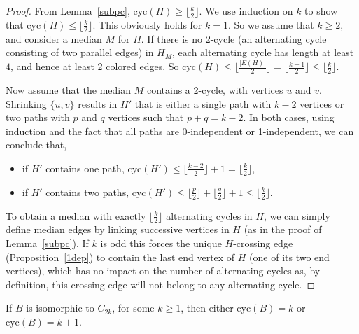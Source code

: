 \documentclass[10pt]{llncs}
\begin{document}
\begin{proof}
  From Lemma~\ref{subpc}, $\text{cyc}(H) \geq \lfloor
  \frac{k}{2}\rfloor$. We use induction on $k$ to show that
  $\text{cyc}(H) \leq \lfloor \frac{k}{2}\rfloor$. This obviously
  holds for $k = 1$. So we assume that $k \geq 2$, and consider a
  median $M$ for $H$. If there is no 2-cycle (an alternating cycle
  consisting of two parallel edges) in $H_M$, each alternating cycle
  has length at least $4$, and hence at least 2 colored edges. So
  $\text{cyc}(H) \leq \lfloor \frac{|E(H)|}{2} \rfloor = \lfloor
  \frac{k-1}{2} \rfloor \leq \lfloor \frac{k}{2}\rfloor$.

  Now assume that the median $M$ contains a 2-cycle, with vertices $u$
  and $v$. Shrinking $\{u, v\}$ results in $H'$ that is either a
  single path with $k-2$ vertices or two paths with $p$ and $q$
  vertices such that $p+q = k-2$.  In both cases, using induction and
  the fact that all paths are 0-independent or 1-independent, we can
  conclude that,
  \begin{itemize}
  \item if $H'$ contains one path, $\text{cyc}(H') \leq \lfloor
    \frac{k-2}{2} \rfloor + 1 = \lfloor \frac{k}{2}\rfloor$,
  \item if $H'$ contains two paths, $\text{cyc}(H') \leq \lfloor
    \frac{p}{2} \rfloor + \lfloor \frac{q}{2} \rfloor + 1 \leq \lfloor
    \frac{k}{2}\rfloor$.
  \end{itemize}
  To obtain a median with exactly $\lfloor \frac{k}{2}\rfloor$
  alternating cycles in $H$, we can simply define median edges by
  linking successive vertices in $H$ (as in the proof of
  Lemma~\ref{subpc}). If $k$ is odd this forces the unique
  $H$-crossing edge (Proposition~\ref{1dep}) to contain the last end
  vertex of $H$ (one of its two end vertices), which has no impact on
  the number of alternating cycles as, by definition, this crossing
  edge will not belong to any alternating cycle.  \end{proof}



\begin{lemma} \label{cycC}
  If $B$ is isomorphic to $C_{2k}$, for some $k\geq 1$, then either
  $\text{cyc}(B) = {k}$ or $\text{cyc}(B) = {k} +1$.
\end{lemma}
\end{document}
